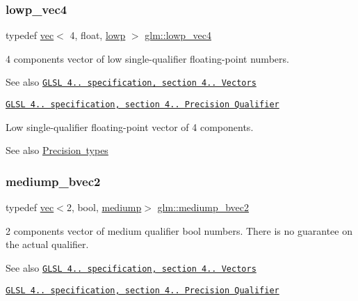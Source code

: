 \subsubsection{\texorpdfstring{lowp\+\_\+vec4}{lowp\_vec4}}
{\footnotesize\ttfamily typedef \mbox{\hyperlink{structglm_1_1vec}{vec}}$<$ 4, float, \mbox{\hyperlink{namespaceglm_a36ed105b07c7746804d7fdc7cc90ff25ae161af3fc695e696ce3bf69f7332bc2d}{lowp}} $>$ \mbox{\hyperlink{group__core__precision_ga9235d8ac062ef68826948ac1df016036}{glm\+::lowp\+\_\+vec4}}}

4 components vector of low single-\/qualifier floating-\/point numbers.

\begin{DoxySeeAlso}{See also}
\href{http://www.opengl.org/registry/doc/GLSLangSpec.4.20.8.pdf}{\tt G\+L\+SL 4.. specification, section 4.. Vectors} 

\href{http://www.opengl.org/registry/doc/GLSLangSpec.4.20.8.pdf}{\tt G\+L\+SL 4.. specification, section 4.. Precision Qualifier}
\end{DoxySeeAlso}
Low single-\/qualifier floating-\/point vector of 4 components. \begin{DoxySeeAlso}{See also}
\mbox{\hyperlink{group__core__precision}{Precision types}} 
\end{DoxySeeAlso}
\mbox{\label{group__core__precision_ga84008d451452ffe0f6c8f395fd61a8df}} 
\subsubsection{\texorpdfstring{mediump\+\_\+bvec2}{mediump\_bvec2}}
{\footnotesize\ttfamily typedef \mbox{\hyperlink{structglm_1_1vec}{vec}}$<$2, bool, \mbox{\hyperlink{namespaceglm_a36ed105b07c7746804d7fdc7cc90ff25a6416f3ea0c9025fb21ed50c4d6620482}{mediump}}$>$ \mbox{\hyperlink{group__core__precision_ga84008d451452ffe0f6c8f395fd61a8df}{glm\+::mediump\+\_\+bvec2}}}

2 components vector of medium qualifier bool numbers. There is no guarantee on the actual qualifier.

\begin{DoxySeeAlso}{See also}
\href{http://www.opengl.org/registry/doc/GLSLangSpec.4.20.8.pdf}{\tt G\+L\+SL 4.. specification, section 4.. Vectors} 

\href{http://www.opengl.org/registry/doc/GLSLangSpec.4.20.8.pdf}{\tt G\+L\+SL 4.. specification, section 4.. Precision Qualifier} 
\end{DoxySeeAlso}
\mbox{\label{group__core__precision_ga40b0d98c1fef52b1f6f6736c7223e317}} 
